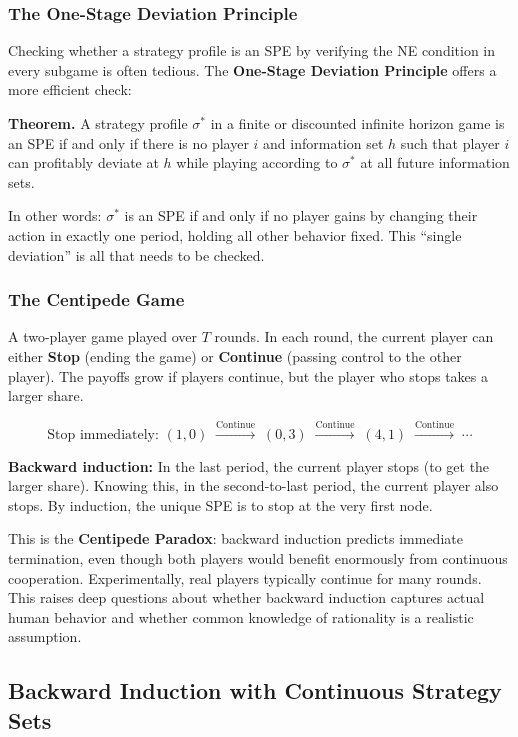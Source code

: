 \documentclass[hidelinks]{article}
\begin{document}
\subsubsection{The One-Stage Deviation Principle}

Checking whether a strategy profile is an SPE by verifying the NE condition in every subgame is often tedious. The \textbf{One-Stage Deviation Principle} offers a more efficient check:

\textbf{Theorem.} A strategy profile $\sigma^*$ in a finite or discounted infinite horizon game is an SPE if and only if there is no player $i$ and information set $h$ such that player $i$ can profitably deviate at $h$ while playing according to $\sigma^*$ at all future information sets.

In other words: $\sigma^*$ is an SPE if and only if no player gains by changing their action in exactly one period, holding all other behavior fixed. This ``single deviation'' is all that needs to be checked.

\subsubsection{The Centipede Game}

A two-player game played over $T$ rounds. In each round, the current player can either \textbf{Stop} (ending the game) or \textbf{Continue} (passing control to the other player). The payoffs grow if players continue, but the player who stops takes a larger share.

\[
\text{Stop immediately: } (1, 0) \;\xrightarrow{\text{Continue}}\; (0, 3) \;\xrightarrow{\text{Continue}}\; (4, 1) \;\xrightarrow{\text{Continue}}\; \cdots
\]

\textbf{Backward induction:} In the last period, the current player stops (to get the larger share). Knowing this, in the second-to-last period, the current player also stops. By induction, the unique SPE is to stop at the very first node.

This is the \textbf{Centipede Paradox}: backward induction predicts immediate termination, even though both players would benefit enormously from continuous cooperation. Experimentally, real players typically continue for many rounds. This raises deep questions about whether backward induction captures actual human behavior and whether common knowledge of rationality is a realistic assumption.

\subsection{Backward Induction with Continuous Strategy Sets}
\end{document}
